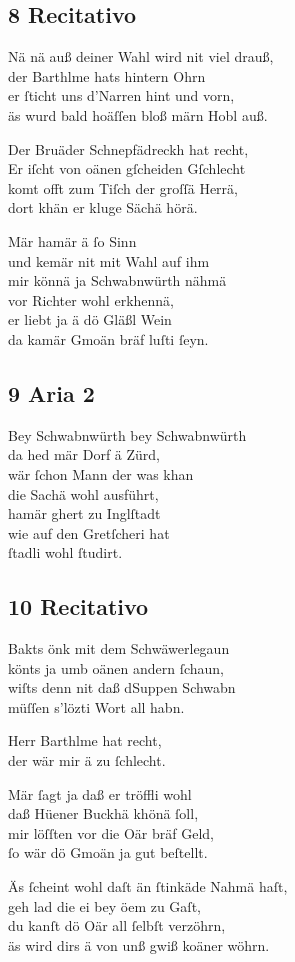 \documentclass{ees}
\newenvironment{lyrics}[1]{%
  \subsection{#1}\nopagebreak%
  \begin{lyricslist}%
  \let\voice\item%
}{%
  \end{lyricslist}%
}
\begin{document}
\begin{lyrics}{8 Recitativo}
  \voice[Schnepfendrekh]
  Nä nä auß deiner Wahl wird nit viel drauß,\\
  der Barthlme hats hintern Ohrn\\
  er ſticht uns d’Narren hint und vorn,\\
  äs wurd bald hoäſſen bloß märn Hobl auß.

  \voice[Schwabnwürth]
  Der Bruäder Schnepfädreckh hat recht,\\
  Er iſcht von oänen gſcheiden Gſchlecht\\
  komt offt zum Tiſch der groſſä Herrä,\\
  dort khän er kluge Sächä hörä.

  \voice[Mazko]
  Mär hamär ä ſo Sinn\\
  und kemär nit mit Wahl auf ihm\\
  mir könnä ja Schwabnwürth nähmä\\
  vor Richter wohl erkhennä,\\
  er liebt ja ä dö Gläßl Wein\\
  da kamär Gmoän bräf luſti ſeyn.
\end{lyrics}

\begin{lyrics}{9 Aria 2}
  \voice[Mazko]
  Bey Schwabnwürth bey Schwabnwürth\\
  da hed mär Dorf ä Zürd,\\
  wär ſchon Mann der was khan\\
  die Sachä wohl ausführt,\\
  hamär ghert zu Inglſtadt\\
  wie auf den Gretſcheri hat\\
  ſtadli wohl ſtudirt.
\end{lyrics}

\begin{lyrics}{10 Recitativo}
  \voice[Barthlme]
  Bakts önk mit dem Schwäwerlegaun\\
  könts ja umb oänen andern ſchaun,\\
  wiſts denn nit daß dSuppen Schwabn\\
  müſſen s’lözti Wort all habn.

  \voice[Schullmeiſter]
  Herr Barthlme hat recht,\\
  der wär mir ä zu ſchlecht.

  \voice[Schnepfendrekh]
  Mär ſagt ja daß er tröffli wohl\\
  daß Hüener Buckhä khönä ſoll,\\
  mir löſſten vor die Oär bräf Geld,\\
  ſo wär dö Gmoän ja gut beſtellt.

  \voice[Barthlme]
  Äs ſcheint wohl daſt än ſtinkäde Nahmä haſt,\\
  geh lad die ei bey öem zu Gaſt,\\
  du kanſt dö Oär all ſelbſt verzöhrn,\\
  äs wird dirs ä von unß gwiß koäner wöhrn.
\end{lyrics}
\end{document}
